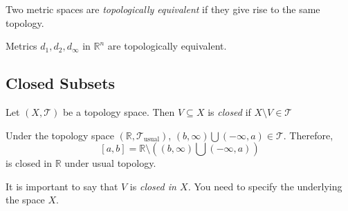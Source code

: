 \begin{definition}[Equivalence]
Two metric spaces are \emph{topologically equivalent} if they give rise to the same topology.
\end{definition}
\begin{example}
Metrics $d_1,d_2,d_\infty$ in $\mathbb{R}^n$ are topologically equivalent.
\end{example}
\subsection{Closed Subsets}
\begin{definition}[Closed]
Let $(X,\mathcal{T})$ be a topology space. Then $V\subseteq X$ is \emph{closed} if $X\setminus V\in \mathcal{T}$
\end{definition}
\begin{example}
Under the topology space $(\mathbb{R},\mathcal{T}_{\text{usual}})$, $(b,\infty)\bigcup(-\infty,a)\in\mathcal{T}$. Therefore,
\[
[a,b]=\mathbb{R}\setminus\left((b,\infty)\bigcup(-\infty,a)\right)
\]
is closed in $\mathbb{R}$ under usual topology.
\end{example}

\begin{remark}
It is important to say that $V$ is \emph{closed in $X$.} You need to specify the underlying the space $X$.
\end{remark}

















